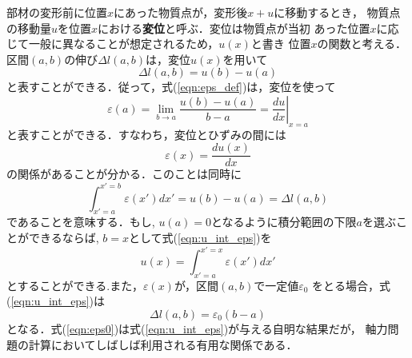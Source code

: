 \documentclass[10pt,a4j]{jbook}
\begin{document}
部材の変形前に位置$x$にあった物質点が，変形後$x+u$に移動するとき，
物質点の移動量$u$を位置$x$における{\rm \bf 変位}と呼ぶ．変位は物質点が当初
あった位置$x$に応じて一般に異なることが想定されるため，$u(x)$と書き
位置$x$の関数と考える．
区間$(a,b)$の伸び$\Delta l(a,b)$は，変位$u(x)$を用いて
\begin{equation}
	\Delta l(a,b)=u(b)-u(a)
	\label{eqn:dell_u}
\end{equation}
と表すことができる．従って，式(\ref{eqn:eps_def})は，変位を使って
\begin{equation}
	\varepsilon(a) = \lim _{b\rightarrow a} \frac{u(b)-u(a)}{b-a}= \left.\frac{du}{dx}\right|_{x=a}
	\label{eqn:eps_u}
\end{equation}
と表すことができる．すなわち，変位とひずみの間には
\begin{equation}
	\varepsilon(x)=\frac{du(x)}{dx}
	\label{eqn:e_dudx}
\end{equation}
の関係があることが分かる．このことは同時に
\begin{equation}
	\int_{x'=a}^{x'=b} \varepsilon(x') dx'=u(b)-u(a)=\Delta l (a,b)
	\label{eqn:u_int_eps}
\end{equation}
であることを意味する．もし, $u(a)=0$となるように積分範囲の下限$a$を選ぶことができるならば, 
$b=x$として式(\ref{eqn:u_int_eps})を
\begin{equation}
	u(x)=\int_{x'=a}^{x'=x} \varepsilon(x') dx'
	\label{eqn:u_int_eps0}
\end{equation}
とすることができる.また，$\varepsilon(x)$が，区間$(a,b)$で一定値$\varepsilon_0$
をとる場合，式(\ref{eqn:u_int_eps})は
\begin{equation}
	\Delta l(a,b)=\varepsilon_0 (b-a)
	\label{eqn:eps0}
\end{equation}
となる．式(\ref{eqn:eps0})は式(\ref{eqn:u_int_eps})が与える自明な結果だが，
軸力問題の計算においてしばしば利用される有用な関係である．
\end{document}
